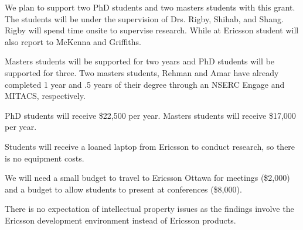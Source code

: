 \documentclass[12pt, letterpaper]{article}
\begin{document}
\fancyhead{}
\pagestyle{fancy}
\renewcommand{\headrulewidth}{0pt}

\begin{center}
\begin{LARGE}
\noindent
{}
\end{LARGE}
\end{center}


We plan to support two PhD students and two masters students with this grant.
The students will be under the supervision of Drs. Rigby, Shihab, and Shang. Rigby will spend time onsite to supervise research. While at Ericsson student will also report to McKenna and Griffiths.

Masters students will be supported for two years and PhD students will be supported for three. Two masters students, Rehman and Amar have already completed 1 year and .5 years of their degree through an NSERC Engage and MITACS, respectively.

PhD students will receive \$22,500 per year. Masters students will receive \$17,000 per year. 

Students will receive a loaned laptop from Ericsson to conduct research, so there is no equipment costs.

We will need a small budget to travel to Ericsson Ottawa for meetings (\$2,000) and a budget to allow students to present at conferences (\$8,000).

There is no expectation of intellectual property issues as the findings involve
the Ericsson development environment instead of Ericsson products.
\end{document}
